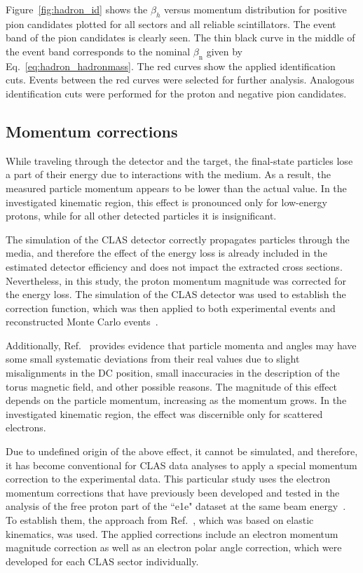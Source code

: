 \documentclass[prc,twocolumn,superscriptaddress,showpacs,amssymb,amsmath,amsfonts,aps,nofootinbib]{revtex4-1}
\begin{document}
Figure~\ref{fig:hadron_id} shows the $\beta_{h}$ versus momentum distribution for positive pion candidates plotted for all sectors and all reliable scintillators. The event band of the pion candidates is clearly seen. The thin black curve in the middle of the event band corresponds to the nominal $\beta_{\text{n}}$ given by Eq.\!~\eqref{eq:hadron_hadronmass}. The red curves show the applied identification cuts. Events between the red curves were selected for further analysis. Analogous identification cuts were performed for the proton and negative pion candidates.


\subsection{Momentum corrections}

While traveling through the detector and the target, the final-state particles lose a part of their energy due to interactions with the medium. As a result, the measured particle momentum appears to be lower than the actual value. In the investigated kinematic region, this effect is pronounced only for low-energy protons, while for all other detected particles it is insignificant.

The simulation of the CLAS detector correctly propagates particles through the media, and therefore the effect of the energy loss is already included in the estimated detector efficiency and does not impact the extracted cross sections. Nevertheless, in this study, the proton momentum magnitude was corrected for the energy loss. The simulation of the CLAS detector was used to establish the correction function, which was then applied to both experimental events and reconstructed Monte Carlo events~\cite{my_an_note:2020, my_thesis:2021}.

Additionally, Ref.\!~\cite{KPark:momcorr} provides evidence that particle momenta and angles may have some small systematic deviations from their real values due to slight misalignments in the DC position, small inaccuracies in the description of the torus magnetic field, and other possible reasons. The magnitude of this effect depends on the particle momentum, increasing as the momentum grows. In the investigated kinematic region, the effect was discernible only for scattered electrons. 

Due to undefined origin of the above effect, it cannot be simulated, and therefore, it has become conventional for CLAS data analyses to apply a special momentum correction to the experimental data. This particular study uses the electron momentum corrections that have previously been developed and tested in the analysis of the free proton part of the ``e1e" dataset at the same beam energy~\cite{Fed_an_note:2017,Fed_paper_2018}. To establish them, the approach from Ref.~\cite{KPark:momcorr}, which was based on elastic kinematics, was used. The applied corrections include an electron momentum magnitude correction as well as an electron polar angle correction, which were developed for each CLAS sector individually.  
\end{document}
